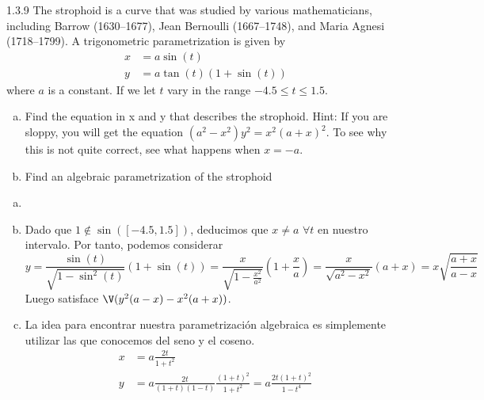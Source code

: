 \documentclass[twoside]{article}
\begin{document}
\newpage

\begin{ejercicio}{1.3.9}
The strophoid is a curve that was studied by various mathematicians, including Barrow (1630–1677), Jean Bernoulli (1667–1748), and Maria Agnesi (1718–1799). A trigonometric parametrization is given by
\begin{align*}
x&=a\sin(t)\\
y&=a\tan(t)(1+\sin(t))
\end{align*}
where $a$ is a constant. If we let $t$ vary in the range $−4.5 ≤ t ≤ 1.5$.
\begin{enumerate}[a.]
\item Find the equation in x and y that describes the strophoid. Hint: If you are sloppy, you will get the equation $(a^2 − x^2)y^2 = x^2(a + x)^2$. To see why this is not quite correct, see what happens when $x = −a$.
\item Find an algebraic parametrization of the strophoid
\end{enumerate}
\end{ejercicio}
\begin{solucion}
\begin{enumerate}[a.]
\item[]
\item Dado que $1\notin \sin([-4.5,1.5])$, deducimos que $x\neq a$ $\forall t$ en nuestro intervalo. Por tanto, podemos considerar
$$
y=\frac{\sin(t)}{\sqrt{1-\sin^2(t)}}(1+\sin(t)) =\frac{x}{\sqrt{1-\frac{x^2}{a^2}}}\left(1+\frac{x}{a}\right)=\frac{x}{\sqrt{a^2-{x^2}}}(a+x) = x\sqrt{\frac{a+x}{a-x}}
$$
Luego satisface $\V(y^2(a-x)-x^2(a+x))$. 
\item La idea para encontrar nuestra parametrización algebraica es simplemente utilizar las que conocemos del seno y el coseno.
\begin{align*}
x&=a\frac{2t}{1+t^2}\\
y&=a\frac{2t}{(1+t)(1-t)}\frac{(1+t)^2}{1+t^2} = a\frac{2t(1+t)^2}{1-t^4}
\end{align*}
\end{enumerate}
\end{solucion}
\newpage
\end{document}
